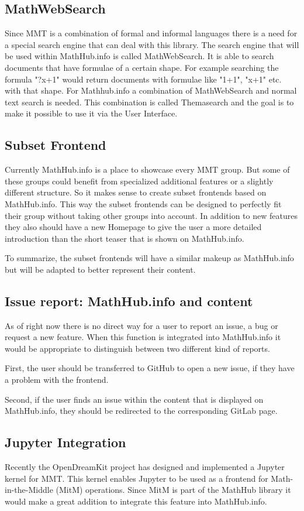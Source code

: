\documentclass[11pt,a4paper]{article}
\begin{document}
\subsection{MathWebSearch}
Since MMT is a combination of formal and informal languages there is a need for a special search engine that can deal with this library.
The search engine that will be used within MathHub.info is called MathWebSearch\cite{HamKoh:fsfm15}.
It is able to search documents that have formulae of a certain shape.
For example searching the formula "?x+1" would return documents with formulae like "1+1", "x+1" etc. with that shape.
For Mathhub.info a combination of MathWebSearch and normal text search is needed.
This combination is called Themasearch and the goal is to make it possible to use it via the User Interface.

\subsection{Subset Frontend}
Currently MathHub.info is a place to showcase every MMT group.
But some of these groups could benefit from specialized additional features or a slightly different structure.
So it makes sense to create subset frontends based on MathHub.info.
This way the subset frontends can be designed to perfectly fit their group without taking other groups into account.
In addition to new features they also should have a new Homepage to give the user a more detailed introduction than the short teaser that is shown on MathHub.info.

To summarize, the subset frontends will have a similar makeup as MathHub.info but will be adapted to better represent their content.

\subsection{Issue report: MathHub.info and content}
As of right now there is no direct way for a user to report an issue, a bug or request a new feature.
When this function is integrated into MathHub.info it would be appropriate to distinguish between two different kind of reports.

First, the user should be transferred to GitHub to open a new issue, if they have a problem with the frontend.

Second, if the user finds an issue within the content that is displayed on MathHub.info, they should be redirected to the corresponding GitLab page. 
\subsection{Jupyter Integration}
Recently the OpenDreamKit project has designed and implemented a Jupyter kernel\cite{notebook} for MMT. 
This kernel enables Jupyter to be used as a frontend for Math-in-the-Middle (MitM) operations.
Since MitM is part of the MathHub library it would make a great addition to integrate this feature into MathHub.info.
\newpage
\printbibliography
{}
\end{document}
